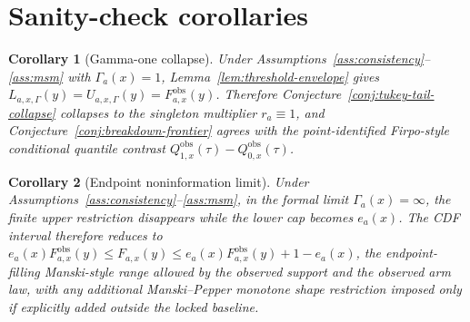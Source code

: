 \documentclass[11pt]{article}
\theoremstyle{definition}
\theoremstyle{plain}
\newtheorem{corollary}{Corollary}
\theoremstyle{remark}
\begin{document}
\section{Sanity-check corollaries}
\begin{corollary}[Gamma-one collapse]\label{cor:gamma-one}
Under Assumptions~\ref{ass:consistency}--\ref{ass:msm} with \(\Gamma_a(x)=1\), Lemma~\ref{lem:threshold-envelope} gives \(L_{a,x,\Gamma}(y)=U_{a,x,\Gamma}(y)=F^{\mathrm{obs}}_{a,x}(y)\).  Therefore Conjecture~\ref{conj:tukey-tail-collapse} collapses to the singleton multiplier \(r_a\equiv 1\), and Conjecture~\ref{conj:breakdown-frontier} agrees with the point-identified Firpo-style conditional quantile contrast \(Q^{\mathrm{obs}}_{1,x}(\tau)-Q^{\mathrm{obs}}_{0,x}(\tau)\).
\end{corollary}

\begin{corollary}[Endpoint noninformation limit]\label{cor:gamma-infty}
Under Assumptions~\ref{ass:consistency}--\ref{ass:msm}, in the formal limit \(\Gamma_a(x)=\infty\), the finite upper restriction disappears while the lower cap becomes \(e_a(x)\).  The CDF interval therefore reduces to \(e_a(x)F^{\mathrm{obs}}_{a,x}(y)\le F_{a,x}(y)\le e_a(x)F^{\mathrm{obs}}_{a,x}(y)+1-e_a(x)\), the endpoint-filling Manski-style range allowed by the observed support and the observed arm law, with any additional Manski--Pepper monotone shape restriction imposed only if explicitly added outside the locked baseline.
\end{corollary}
\end{document}
